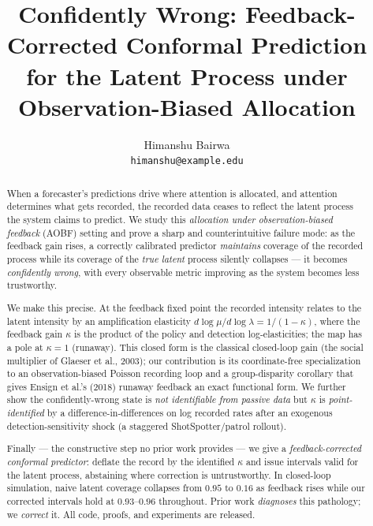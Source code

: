 \documentclass[10pt]{article}
\title{\textbf{Confidently Wrong: Feedback-Corrected Conformal Prediction
for the Latent Process under Observation-Biased Allocation}}
\author{Himanshu Bairwa \\ \texttt{himanshu@example.edu}}
\date{}
\begin{document}
\maketitle

\begin{abstract}
When a forecaster's predictions drive where attention is allocated, and
attention determines what gets recorded, the recorded data ceases to reflect the
latent process the system claims to predict. We study this
\emph{allocation under observation-biased feedback} (AOBF) setting and prove a
sharp and counterintuitive failure mode: as the feedback gain rises, a
correctly calibrated predictor \emph{maintains} coverage of the recorded process
while its coverage of the \emph{true latent} process silently collapses --- it
becomes \emph{confidently wrong}, with every observable metric improving as the
system becomes less trustworthy.

We make this precise. At the feedback fixed point the recorded intensity relates
to the latent intensity by an amplification elasticity
$d\log\mu / d\log\lambda = 1/(1-\kappa)$, where the feedback gain $\kappa$ is the
product of the policy and detection log-elasticities; the map has a pole at
$\kappa=1$ (runaway). This closed form is the classical closed-loop gain
(the social multiplier of Glaeser et al., 2003); our contribution is its
coordinate-free specialization to an observation-biased Poisson recording loop
and a group-disparity corollary that gives Ensign et al.'s (2018) runaway
feedback an exact functional form. We further show the confidently-wrong state
is \emph{not identifiable from passive data} but $\kappa$ is
\emph{point-identified} by a difference-in-differences on log recorded rates
after an exogenous detection-sensitivity shock (a staggered ShotSpotter/patrol
rollout).

Finally --- the constructive step no prior work provides --- we give a
\emph{feedback-corrected conformal predictor}: deflate the record by the
identified $\kappa$ and issue intervals valid for the latent process, abstaining
where correction is untrustworthy. In closed-loop simulation, naive latent
coverage collapses from $0.95$ to $0.16$ as feedback rises while our corrected
intervals hold at $0.93$--$0.96$ throughout. Prior work \emph{diagnoses} this
pathology; we \emph{correct} it. All code, proofs, and experiments are released.
\end{abstract}

\end{document}
